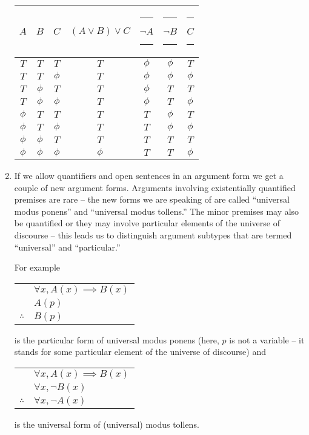 \begin{enumerate}
{\begin{tabular}{|c|c|c||c|c|c||c|} \hline
\rule[-8pt]{0pt}{30pt}$A$ & $B$ & $C$ & $(A \lor B) \lor C$ & \rule{20pt}{0pt} ${\lnot}A$ \rule{20pt}{0pt} & \rule{20pt}{0pt} ${\lnot}B$ \rule{20pt}{0pt} & \rule{20pt}{0pt} $C$ \rule{20pt}{0pt} \\ \hline
\rule[-8pt]{0pt}{30pt}$T$ & $T$ & $T$ & $T$ & $\phi$ & $\phi$ & $T$  \\ \hline
\rule[-8pt]{0pt}{30pt}$T$ & $T$ & $\phi$  & $T$ & $\phi$ & $\phi$ & $\phi$   \\ \hline
\rule[-8pt]{0pt}{30pt}$T$ & $\phi$  & $T$ & $T$ & $\phi$ & $T$  & $T$  \\ \hline
\rule[-8pt]{0pt}{30pt}$T$ & $\phi$  & $\phi$  & $T$ & $\phi$ & $T$ & $\phi$   \\  \hline
\rule[-8pt]{0pt}{30pt}$\phi$  & $T$ & $T$ & $T$ & $T$ & $\phi$ &  $T$ \\ \hline
\rule[-8pt]{0pt}{30pt}$\phi$  & $T$ & $\phi$  & $T$ & $T$ & $\phi$ & $\phi$  \\ \hline
\rule[-8pt]{0pt}{30pt}$\phi$  & $\phi$  & $T$ & $T$ & $T$ & $T$ & $T$  \\ \hline
\rule[-8pt]{0pt}{30pt}$\phi$  & $\phi$  & $\phi$  & $\phi$ & $T$ & $T$ & $\phi$  \\  \hline
\end{tabular}

\vfill
}

\workbookpagebreak

\item If we allow quantifiers and open sentences in an argument form we
get a couple of new argument forms.  Arguments involving existentially quantified 
premises are rare -- the new forms we are speaking of are called ``universal modus 
ponens'' and ``universal modus tollens.''   The minor premises may also be quantified
or they may involve particular elements of the universe of discourse -- this leads
us to distinguish argument subtypes that are termed ``universal'' and ``particular.''

For example  \begin{tabular}{cl}
 & $\forall x, A(x) \implies B(x)$ \\
 & $A(p)$ \\ \hline
$\therefore$ & $B(p)$ \\
\end{tabular}  is the particular form of universal modus ponens (here, $p$
is not a variable -- it stands for some particular element of the universe of
discourse)
and \begin{tabular}{cl}
 & $\forall x, A(x) \implies B(x)$ \\
 & $\forall x, {\lnot}B(x)$ \\ \hline
$\therefore$ & $\forall x, {\lnot}A(x)$ \\
\end{tabular} is the universal form of (universal) modus tollens.


\end{enumerate}
